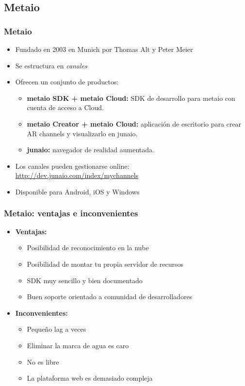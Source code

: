 \subsection*{Metaio}
\frame
{
\frametitle{Metaio}
\begin{itemize}
 \item Fundado en 2003 en Munich por Thomas Alt y Peter Meier
 \item Se estructura en \textit{canales}
 \item Ofrecen un conjunto de productos:
 \begin{itemize}
   \item \textbf{metaio SDK + metaio Cloud:} SDK de desarrollo para metaio con cuenta de acceso a Cloud. 
   \item \textbf{metaio Creator + metaio Cloud:} aplicación de escritorio para crear AR channels y visualizarlo en junaio.
   \item \textbf{junaio:} navegador de realidad aumentada.
 \end{itemize}
 \item Los canales pueden gestionarse online: \\
   \url{http://dev.junaio.com/index/mychannels}
 \item Disponible para Android, iOS y Windows
\end{itemize}
}

\frame
{
\frametitle{Metaio: ventajas e inconvenientes}
\begin{itemize}
\item \textbf{Ventajas:}
  \begin{itemize}
   \item Posibilidad de reconocimiento en la nube
   \item Posibilidad de montar tu propia servidor de recursos
   \item SDK muy sencillo y bien documentado
   \item Buen soporte orientado a comunidad de desarrolladores
  \end{itemize}

\item \textbf{Inconvenientes:}
  \begin{itemize}
   \item Pequeño lag a veces
   \item Eliminar la marca de agua es caro
   \item No es libre
   \item La plataforma web es demasiado compleja 
  \end{itemize}

\end{itemize}
}
